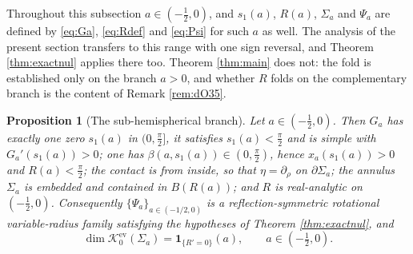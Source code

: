 \documentclass[11pt,a4paper]{amsart}
\theoremstyle{plain}
\newtheorem{proposition}[theorem]{Proposition}
\theoremstyle{definition}
\newcommand{\Ker}{\mathcal{K}}
\begin{document}
Throughout this subsection $a\in(-\tfrac12,0)$, and $s_1(a)$, $R(a)$, $\Sigma_a$ and $\Psi_a$ are defined by \eqref{eq:Ga}, \eqref{eq:Rdef} and \eqref{eq:Psi} for such $a$ as well. The analysis of the present section transfers to this range with one sign reversal, and Theorem \ref{thm:exactnul} applies there too. Theorem \ref{thm:main} does not: the fold is established only on the branch $a>0$, and whether $R$ folds on the complementary branch is the content of Remark \ref{rem:dO35}.

\begin{proposition}[The sub-hemispherical branch]\label{prop:subhemi}
Let $a\in(-\tfrac12,0)$. Then $G_a$ has exactly one zero $s_1(a)$ in $(0,\tfrac\pi2]$, it satisfies $s_1(a)<\tfrac\pi2$ and is simple with $G_a'(s_1(a))>0$; one has $\beta(a,s_1(a))\in(0,\tfrac\pi2)$, hence $x_a(s_1(a))>0$ and $R(a)<\tfrac\pi2$; the contact is from inside, so that
$\eta=\partial_\rho$ on $\partial\Sigma_a$; the annulus $\Sigma_a$ is embedded and contained in $B(R(a))$; and $R$ is real-analytic on $(-\tfrac12,0)$.
Consequently $\{\Psi_a\}_{a\in(-1/2,0)}$ is a reflection-symmetric rotational variable-radius family satisfying the hypotheses of Theorem \ref{thm:exactnul}, and
\[
\dim\Ker_0^{\mathrm{ev}}(\Sigma_a)=\mathbf 1_{\{R'=0\}}(a),
\qquad a\in(-\tfrac12,0).
\]
\end{proposition}
\end{document}
